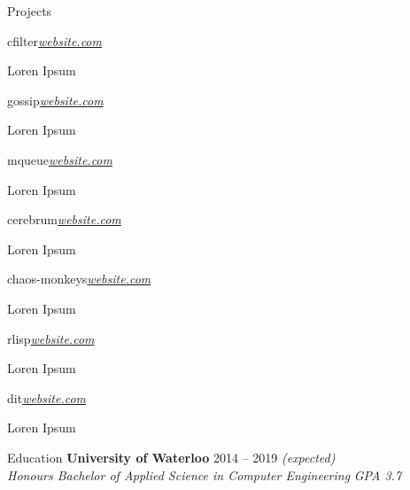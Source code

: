 \documentclass{resume} %
\begin{document}
\begin{rSection}{Projects}
  \begin{rSubsection}{cfilter}{\em \href{http://website.com}{website.com}}{}

    \item Loren Ipsum
  \end{rSubsection}

  \begin{rSubsection}{gossip}{\em \href{http://website.com}{website.com}}{}

    \item Loren Ipsum
  \end{rSubsection}

  \begin{rSubsection}{mqueue}{\em \href{http://website.com}{website.com}}{}

    \item Loren Ipsum
  \end{rSubsection}
  
  \begin{rSubsection}{cerebrum}{\em \href{http://website.com}{website.com}}{}

    \item Loren Ipsum
  \end{rSubsection}

  \begin{rSubsection}{chaos-monkeys}{\em \href{http://website.com}{website.com}}{}

    \item Loren Ipsum
  \end{rSubsection}

  \begin{rSubsection}{rlisp}{\em \href{http://website.com}{website.com}}{}

    \item Loren Ipsum
  \end{rSubsection}

  \begin{rSubsection}{dit}{\em \href{http://website.com}{website.com}}{}

    \item Loren Ipsum
  \end{rSubsection}
\end{rSection}


\begin{rSection}{Education}
  {\bf University of Waterloo} \hfill {2014 -- 2019 \em (expected)} \\
  {\em Honours Bachelor of Applied Science in Computer Engineering} \hfill {\em GPA 3.7}
\end{rSection}
\end{document}
